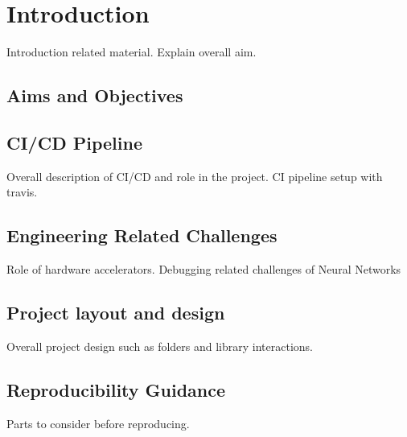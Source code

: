 \chapter{Introduction} \label{chap:introduction}

Introduction related material. Explain overall aim.
\section{Aims and Objectives}

\section{CI/CD Pipeline}
Overall description of CI/CD and role in the project. CI pipeline setup with travis.

\section{Engineering Related Challenges}
Role of hardware accelerators. Debugging related challenges of Neural Networks

\section{Project layout and design}
Overall project design such as folders and library interactions.

\section{Reproducibility Guidance}
Parts to consider before reproducing.

\clearpage